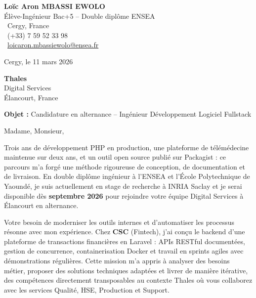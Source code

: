 \documentclass[a4paper,11pt]{article}
\begin{document}
\noindent
\begin{minipage}[t]{0.5\textwidth}
    \textbf{Loïc Aron MBASSI EWOLO}\\
    Élève-Ingénieur Bac+5 -- Double diplôme ENSEA\\[3pt]
    \faMapMarker\ Cergy, France\\
    \faPhone\ (+33) 7 59 52 33 98\\
    \faEnvelope\ \href{mailto:loicaron.mbassiewolo@ensea.fr}{loicaron.mbassiewolo@ensea.fr}
\end{minipage}
\hfill
\begin{minipage}[t]{0.4\textwidth}
    \raggedleft
    Cergy, le 11 mars 2026
\end{minipage}

\vspace{1.2cm}

\hfill
\begin{minipage}[t]{0.5\textwidth}
    \raggedleft
    \textbf{Thales}\\
    Digital Services\\
    Élancourt, France
\end{minipage}

\vspace{1cm}

\noindent\textbf{Objet :} Candidature en alternance -- Ingénieur Développement Logiciel Fullstack

\vspace{0.8cm}

Madame, Monsieur,

Trois ans de développement PHP en production, une plateforme de télémédecine maintenue sur deux ans, et un outil open source publié sur Packagist : ce parcours m'a forgé une méthode rigoureuse de conception, de documentation et de livraison. En double diplôme ingénieur à l'ENSEA et l'École Polytechnique de Yaoundé, je suis actuellement en stage de recherche à INRIA Saclay et je serai disponible dès \textbf{septembre 2026} pour rejoindre votre équipe Digital Services à Élancourt en alternance.

Votre besoin de moderniser les outils internes et d'automatiser les processus résonne avec mon expérience. Chez \textbf{CSC} (Fintech), j'ai conçu le backend d'une plateforme de transactions financières en Laravel : APIs RESTful documentées, gestion de concurrence, containerisation Docker et travail en sprints agiles avec démonstrations régulières. Cette mission m'a appris à analyser des besoins métier, proposer des solutions techniques adaptées et livrer de manière itérative, des compétences directement transposables au contexte Thales où vous collaborez avec les services Qualité, HSE, Production et Support.
\end{document}
